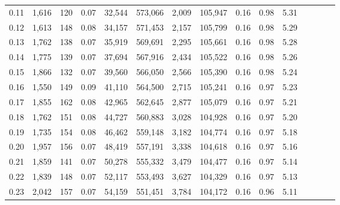 \begin{tabular}{rrrcrrrrrrrrrrr}
0.11 &   1,616 &    120 &                                       0.07 &   32,544 &  573,066 &    2,009 &  105,947 &  0.16 &  0.98 &                         5.31 \\
0.12 &   1,613 &    148 &                                       0.08 &   34,157 &  571,453 &    2,157 &  105,799 &  0.16 &  0.98 &                         5.29 \\
0.13 &   1,762 &    138 &                                       0.07 &   35,919 &  569,691 &    2,295 &  105,661 &  0.16 &  0.98 &                         5.28 \\
0.14 &   1,775 &    139 &                                       0.07 &   37,694 &  567,916 &    2,434 &  105,522 &  0.16 &  0.98 &                         5.26 \\
0.15 &   1,866 &    132 &                                       0.07 &   39,560 &  566,050 &    2,566 &  105,390 &  0.16 &  0.98 &                         5.24 \\
0.16 &   1,550 &    149 &                                       0.09 &   41,110 &  564,500 &    2,715 &  105,241 &  0.16 &  0.97 &                         5.23 \\
0.17 &   1,855 &    162 &                                       0.08 &   42,965 &  562,645 &    2,877 &  105,079 &  0.16 &  0.97 &                         5.21 \\
0.18 &   1,762 &    151 &                                       0.08 &   44,727 &  560,883 &    3,028 &  104,928 &  0.16 &  0.97 &                         5.20 \\
0.19 &   1,735 &    154 &                                       0.08 &   46,462 &  559,148 &    3,182 &  104,774 &  0.16 &  0.97 &                         5.18 \\
0.20 &   1,957 &    156 &                                       0.07 &   48,419 &  557,191 &    3,338 &  104,618 &  0.16 &  0.97 &                         5.16 \\
0.21 &   1,859 &    141 &                                       0.07 &   50,278 &  555,332 &    3,479 &  104,477 &  0.16 &  0.97 &                         5.14 \\
0.22 &   1,839 &    148 &                                       0.07 &   52,117 &  553,493 &    3,627 &  104,329 &  0.16 &  0.97 &                         5.13 \\
0.23 &   2,042 &    157 &                                       0.07 &   54,159 &  551,451 &    3,784 &  104,172 &  0.16 &  0.96 &                         5.11 \\

\end{tabular}
